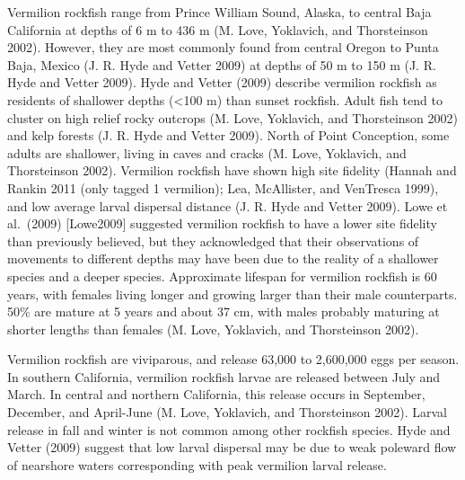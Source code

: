 \documentclass[11pt,
  english,
  a4paper,
]{article}
\begin{document}
Vermilion rockfish range from Prince William Sound, Alaska, to central Baja California at depths of 6 m to 436 m {(M. Love, Yoklavich, and Thorsteinson 2002)\leavevmode\tagmcend\tagstructend}. However, they are most commonly found from central Oregon to Punta Baja, Mexico {(J. R. Hyde and Vetter 2009)\leavevmode\tagmcend\tagstructend} at depths of 50 m to 150 m {(J. R. Hyde and Vetter 2009)\leavevmode\tagmcend\tagstructend}. Hyde and Vetter {(2009)\leavevmode\tagmcend\tagstructend} describe vermilion rockfish as residents of shallower depths (\textless100 m) than sunset rockfish. Adult fish tend to cluster on high relief rocky outcrops {(M. Love, Yoklavich, and Thorsteinson 2002)\leavevmode\tagmcend\tagstructend} and kelp forests {(J. R. Hyde and Vetter 2009)\leavevmode\tagmcend\tagstructend}. North of Point Conception, some adults are shallower, living in caves and cracks {(M. Love, Yoklavich, and Thorsteinson 2002)\leavevmode\tagmcend\tagstructend}. Vermilion rockfish have shown high site fidelity {(Hannah and Rankin 2011 (only tagged 1 vermilion); Lea, McAllister, and VenTresca 1999)\leavevmode\tagmcend\tagstructend}, and low average larval dispersal distance {(J. R. Hyde and Vetter 2009)\leavevmode\tagmcend\tagstructend}. Lowe et al.~(2009) {[}Lowe2009{]} suggested vermilion rockfish to have a lower site fidelity than previously believed, but they acknowledged that their observations of movements to different depths may have been due to the reality of a shallower species and a deeper species. Approximate lifespan for vermilion rockfish is 60 years, with females living longer and growing larger than their male counterparts. 50\% are mature at 5 years and about 37 cm, with males probably maturing at shorter lengths than females {(M. Love, Yoklavich, and Thorsteinson 2002)\leavevmode\tagmcend\tagstructend}.

Vermilion rockfish are viviparous, and release 63,000 to 2,600,000 eggs per season. In southern California, vermilion rockfish larvae are released between July and March. In central and northern California, this release occurs in September, December, and April-June {(M. Love, Yoklavich, and Thorsteinson 2002)\leavevmode\tagmcend\tagstructend}. Larval release in fall and winter is not common among other rockfish species. Hyde and Vetter {(2009)\leavevmode\tagmcend\tagstructend} suggest that low larval dispersal may be due to weak poleward flow of nearshore waters corresponding with peak vermilion larval release.
\end{document}
